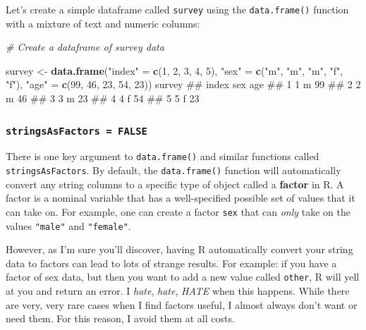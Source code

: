 \documentclass[]{book}
\newenvironment{Shaded}{\begin{snugshade}}{\end{snugshade}}
\newcommand{\KeywordTok}[1]{\textcolor[rgb]{0.13,0.29,0.53}{\textbf{#1}}}
\newcommand{\DecValTok}[1]{\textcolor[rgb]{0.00,0.00,0.81}{#1}}
\newcommand{\StringTok}[1]{\textcolor[rgb]{0.31,0.60,0.02}{#1}}
\newcommand{\CommentTok}[1]{\textcolor[rgb]{0.56,0.35,0.01}{\textit{#1}}}
\newcommand{\NormalTok}[1]{#1}
\theoremstyle{definition}
\theoremstyle{definition}
\theoremstyle{remark}
\begin{document}
Let's create a simple dataframe called \texttt{survey} using the
\texttt{data.frame()} function with a mixture of text and numeric
columns:

\begin{Shaded}
\begin{Highlighting}[]
\CommentTok{# Create a dataframe of survey data}

\NormalTok{survey <-}\StringTok{ }\KeywordTok{data.frame}\NormalTok{(}\StringTok{"index"}\NormalTok{ =}\StringTok{ }\KeywordTok{c}\NormalTok{(}\DecValTok{1}\NormalTok{, }\DecValTok{2}\NormalTok{, }\DecValTok{3}\NormalTok{, }\DecValTok{4}\NormalTok{, }\DecValTok{5}\NormalTok{),}
                     \StringTok{"sex"}\NormalTok{ =}\StringTok{ }\KeywordTok{c}\NormalTok{(}\StringTok{"m"}\NormalTok{, }\StringTok{"m"}\NormalTok{, }\StringTok{"m"}\NormalTok{, }\StringTok{"f"}\NormalTok{, }\StringTok{"f"}\NormalTok{),}
                     \StringTok{"age"}\NormalTok{ =}\StringTok{ }\KeywordTok{c}\NormalTok{(}\DecValTok{99}\NormalTok{, }\DecValTok{46}\NormalTok{, }\DecValTok{23}\NormalTok{, }\DecValTok{54}\NormalTok{, }\DecValTok{23}\NormalTok{))}
\NormalTok{survey}
\NormalTok{##   index sex age}
\NormalTok{## 1     1   m  99}
\NormalTok{## 2     2   m  46}
\NormalTok{## 3     3   m  23}
\NormalTok{## 4     4   f  54}
\NormalTok{## 5     5   f  23}
\end{Highlighting}
\end{Shaded}

\subsubsection{\texorpdfstring{\texttt{stringsAsFactors\ =\ FALSE}}{stringsAsFactors = FALSE}}\label{stringsasfactors-false}

There is one key argument to \texttt{data.frame()} and similar functions
called \texttt{stringsAsFactors}. By default, the \texttt{data.frame()}
function will automatically convert any string columns to a specific
type of object called a \textbf{factor} in R. A factor is a nominal
variable that has a well-specified possible set of values that it can
take on. For example, one can create a factor \texttt{sex} that can
\emph{only} take on the values \texttt{"male"} and \texttt{"female"}.

However, as I'm sure you'll discover, having R automatically convert
your string data to factors can lead to lots of strange results. For
example: if you have a factor of sex data, but then you want to add a
new value called \texttt{other}, R will yell at you and return an error.
I \emph{hate}, \emph{hate}, \emph{HATE} when this happens. While there
are very, very rare cases when I find factors useful, I almost always
don't want or need them. For this reason, I avoid them at all costs.
\end{document}
